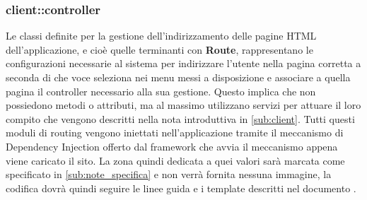 %


\subsubsection{client::controller} %
\label{ssub:bdsm_app_client_controller}
Le classi definite per la gestione dell'indirizzamento delle pagine HTML dell'applicazione, e cioè quelle terminanti con \textbf{Route}, rappresentano le configurazioni necessarie al sistema per indirizzare l'utente nella pagina corretta a seconda di che voce seleziona nei menu messi a disposizione e associare a quella pagina il controller necessario alla sua gestione. \newline
Questo implica che non possiedono metodi o attributi, ma al massimo utilizzano servizi per attuare il loro compito che vengono descritti nella nota introduttiva in \ref{sub:client}. Tutti questi moduli di routing vengono iniettati nell'applicazione tramite il meccanismo di Dependency Injection offerto dal framework che avvia il meccanismo appena viene caricato il sito. \newline
La zona quindi dedicata a quei valori sarà marcata come specificato in \ref{sub:note_specifica} e non verrà fornita nessuna immagine, la codifica dovrà quindi seguire le linee guida e i template descritti nel documento \docNameVersionNdP.


